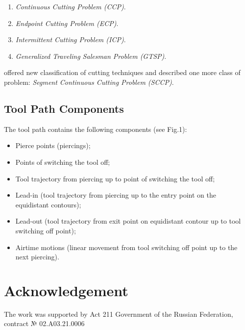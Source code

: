 \documentclass{../download/tPRS2e}
\begin{document}
\begin{enumerate}
\item \textit{Continuous Cutting Problem (CCP)}.
\item \textit{Endpoint Cutting Problem (ECP)}.
\item \textit{Intermittent Cutting Problem (ICP)}. 
\item \textit{Generalized Traveling Salesman Problem (GTSP)}.
\end{enumerate}

\cite{petunin_modeling_2015} offered new classification of cutting techniques and described one more class of problem:
\textit{Segment Continuous Cutting Problem (SCCP)}.

\subsection{Tool Path Components}

The tool path contains the following components (see Fig.1):

\begin{itemize}
\item Pierce points (piercings);
\item Points of switching the tool off;
\item Tool trajectory from piercing up to point of switching the tool off; 
\item Lead-in (tool trajectory from piercing up to the entry point on the equidistant contours); 
\item Lead-out (tool trajectory from exit point on equidistant contour up to tool switching off point); 
\item Airtime motions (linear movement from tool switching off point up to the next piercing).
\end{itemize}

\section{Acknowledgement}

The work was supported by Act 211 Government of the Russian Federation, contract № 02.A03.21.0006


\nocite{*}

\end{document}
